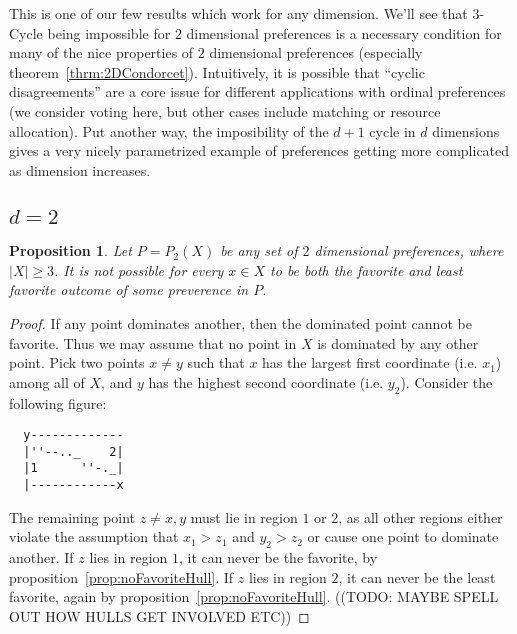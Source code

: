 \documentclass[12pt]{article}
\newtheorem{proposition}[theorem]{Proposition}
\newcommand{\1}[1]{\mathds{1}[{#1}]}
\begin{document}
  This is one of our few results which work for any dimension.
  We'll see that $3$-{Cycle} being impossible for $2$ dimensional preferences
  is a necessary condition for many of the nice properties of $2$ dimensional
  preferences (especially theorem~\ref{thrm:2DCondorcet}).
  Intuitively, it is possible that ``cyclic disagreements'' are a core issue for
  different applications with ordinal preferences (we consider voting here, but
  other cases include matching or resource allocation).
  Put another way, the imposibility of the $d+1$ cycle in $d$ dimensions gives a
  very nicely parametrized example of preferences getting more complicated as
  dimension increases.


  \subsection{$d=2$}

    \begin{proposition}
      Let $P = P_2(X)$ be any set of $2$ dimensional preferences,
      where $|X| \ge 3$.
      It is not possible for every $x\in X$ to be both the
      favorite and least favorite outcome of some preverence in $P$.
    \end{proposition}
    \begin{proof}
      If any point dominates another, then the dominated point cannot be favorite.
      Thus we may assume that no point in $X$ is dominated
      by any other point. Pick two points $x \ne y$ such that $x$ has the largest
      first coordinate (i.e. $x_1$) among all of $X$, and $y$ has the highest second
      coordinate (i.e. $y_2$).
      Consider the following figure:
      \begin{verbatim}
  y-------------
  |''--.._    2|
  |1      ''-._|
  |------------x
      \end{verbatim}
      The remaining point $z\ne x,y$ must lie in region $1$ or $2$, as all other
      regions either violate the assumption that $x_1 > z_1$ and $y_2 > z_2$
      or cause one point to dominate another.
      If $z$ lies in region $1$, it can never be the favorite, by
      proposition~\ref{prop:noFavoriteHull}.
      If $z$ lies in region $2$, it can never be the least favorite, again by
      proposition~\ref{prop:noFavoriteHull}.
      ((TODO: MAYBE SPELL OUT HOW HULLS GET INVOLVED ETC))
    \end{proof}
\end{document}
